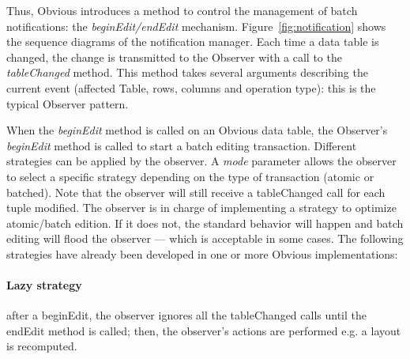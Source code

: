 Thus, Obvious introduces a method to control the management of batch
notifications: the \emph{beginEdit/endEdit} mechanism.
Figure~\ref{fig:notification} shows the sequence diagrams of the
notification manager.  Each time a data table is changed, the change
is transmitted to the Observer with a call to the \emph{tableChanged}
method.  This method takes several arguments describing the current
event (affected Table, rows, columns and operation type): this is the
typical Observer pattern.

When the \emph{beginEdit} method is called on an Obvious data table,
the Observer's \emph{beginEdit} method is called to start a batch
editing transaction.  Different strategies can be applied by the
observer.  A \emph{mode} parameter allows the observer to select a
specific strategy depending on the type of transaction (atomic or
batched).  Note that the observer will still receive a tableChanged
call for each tuple modified.  The observer is in charge of
implementing a strategy to optimize atomic/batch edition.  If it does
not, the standard behavior will happen and batch editing will flood
the observer --- which is acceptable in some cases.  The following
strategies have already been developed in one or more Obvious
implementations:

\paragraph{Lazy strategy} after a beginEdit, the observer ignores all the
  tableChanged calls until the endEdit method is called; then, the
  observer's actions are performed e.g. a layout is recomputed.

